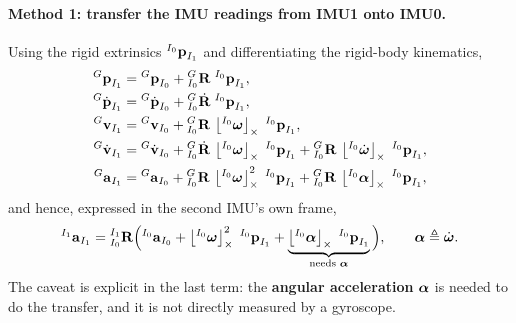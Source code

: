 \paragraph{Method 1: transfer the IMU readings from IMU1 onto IMU0.} Using the rigid extrinsics ${}^{I_0}\vect{p}_{I_1}$ and differentiating the rigid-body kinematics,
\begin{align}
{}^{G}\vect{p}_{I_1} &= {}^{G}\vect{p}_{I_0} + {}^{G}_{I_0}\vect{R}\;{}^{I_0}\vect{p}_{I_1}, \\
{}^{G}\dot{\vect{p}}_{I_1} &= {}^{G}\dot{\vect{p}}_{I_0} + {}^{G}_{I_0}\dot{\vect{R}}\;{}^{I_0}\vect{p}_{I_1}, \\
{}^{G}\vect{v}_{I_1} &= {}^{G}\vect{v}_{I_0} + {}^{G}_{I_0}\vect{R}\,\skewsym{{}^{I_0}\vect{\omega}}\;{}^{I_0}\vect{p}_{I_1}, \\
{}^{G}\dot{\vect{v}}_{I_1} &= {}^{G}\dot{\vect{v}}_{I_0} + {}^{G}_{I_0}\dot{\vect{R}}\,\skewsym{{}^{I_0}\vect{\omega}}\;{}^{I_0}\vect{p}_{I_1}
+ {}^{G}_{I_0}\vect{R}\,\skewsym{{}^{I_0}\dot{\vect{\omega}}}\;{}^{I_0}\vect{p}_{I_1}, \\
{}^{G}\vect{a}_{I_1} &= {}^{G}\vect{a}_{I_0}
+ {}^{G}_{I_0}\vect{R}\,\skewsym{{}^{I_0}\vect{\omega}}^2\;{}^{I_0}\vect{p}_{I_1}
+ {}^{G}_{I_0}\vect{R}\,\skewsym{{}^{I_0}\vect{\alpha}}\;{}^{I_0}\vect{p}_{I_1},
\end{align}
and hence, expressed in the second IMU's own frame,
\begin{align}
{}^{I_1}\vect{a}_{I_1} = {}^{I_1}_{I_0}\vect{R}\Big(
{}^{I_0}\vect{a}_{I_0}
+ \skewsym{{}^{I_0}\vect{\omega}}^2\;{}^{I_0}\vect{p}_{I_1}
+ \underbrace{\skewsym{{}^{I_0}\vect{\alpha}}\;{}^{I_0}\vect{p}_{I_1}}_{\text{needs }\vect{\alpha}}
\Big),
\qquad \vect{\alpha} \triangleq \dot{\vect{\omega}} .
\end{align}
The caveat is explicit in the last term: the \textbf{angular acceleration} $\vect{\alpha}$ is needed to do the transfer, and it is not directly measured by a gyroscope.

